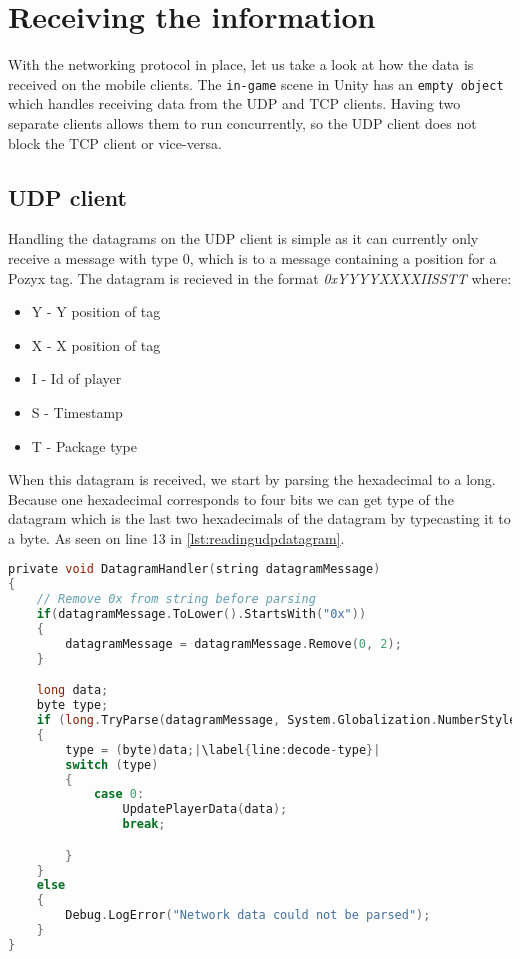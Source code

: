 \section{Receiving the information}
With the networking protocol in place, let us take a look at how the data is received on the mobile clients.
The \texttt{in-game} scene in Unity has an \texttt{empty object} which handles receiving data from the UDP and TCP clients.
Having two separate clients allows them to run concurrently, so the UDP client does not block the TCP client or vice-versa.

\subsection*{UDP client}
Handling the datagrams on the UDP client is simple as it can currently only receive a message with type 0, which is to a message containing a position for a Pozyx tag.
The datagram is recieved in the format \textit{0xYYYYXXXXIISSTT} where:
\begin{itemize}
    \item Y - Y position of tag
    \item X - X position of tag
    \item I - Id of player
    \item S - Timestamp
    \item T - Package type
\end{itemize}

When this datagram is received, we start by parsing the hexadecimal to a long.
Because one hexadecimal corresponds to four bits we can get type of the datagram which is the last two hexadecimals of the datagram by typecasting it to a byte.
As seen on line 13 in \autoref{lst:readingudpdatagram}.

\begin{lstlisting}[caption={Processing datagrams in UDP client}, captionpos=b,language=C,label={lst:readingudpdatagram}]
private void DatagramHandler(string datagramMessage)
{
    // Remove 0x from string before parsing
    if(datagramMessage.ToLower().StartsWith("0x"))
    {
        datagramMessage = datagramMessage.Remove(0, 2);
    }

    long data;
    byte type;
    if (long.TryParse(datagramMessage, System.Globalization.NumberStyles.HexNumber, System.Globalization.CultureInfo.InvariantCulture, out data))
    {
        type = (byte)data;|\label{line:decode-type}|
        switch (type)
        {
            case 0:
                UpdatePlayerData(data);
                break;

        }
    }
    else
    {
        Debug.LogError("Network data could not be parsed");
    }
}
\end{lstlisting}

